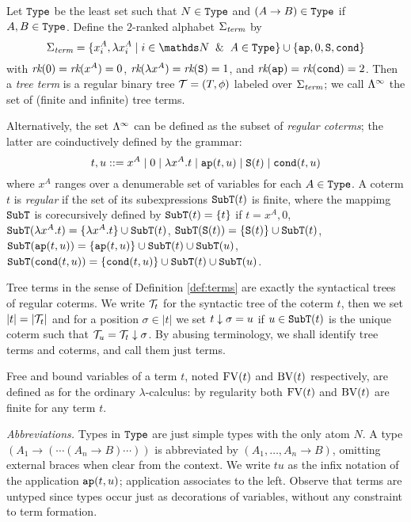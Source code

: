 \begin{definition}\label{def:terms}
Let ${\tt Type}$ be the least
set such that $N \in {\tt Type}$ and $(A \to B) \in {\tt Type}$ if $A,B \in {\tt Type}$.
Define the $2$-ranked alphabet $\Sigma_{\textit{term}}$ by
\[\SigmaTerm = \set{x_i^A, \lambda x_i^A \mid i \in \nat \And A\in \Type} \cup \set{\ap, 0, \Succ, \cond}\]
with $\textit{rk}(0) = \textit{rk}(x^A) = 0$, $\textit{rk}( \lambda x^A) = \textit{rk}({\tt S}) = 1$, and
$\textit{rk}({\tt ap}) = \textit{rk}({\tt cond}) = 2$.
Then a {\em tree term} is a regular binary tree $\BTree = (T, \phi)$ labeled over $\Sigma_{\textit{term}}$; we
call $\Lambda^\infty$ the set of (finite and infinite) tree terms.
\end{definition}

\medskip

Alternatively, the set $\Lambda^\infty$ can be defined as the subset of {\em regular coterms}; the latter are
coinductively defined by the grammar:
\[ t, u ::= x^A \mid 0 \mid \lambda x^A.t \mid {\tt ap}(t,u) \mid {\tt S} (t) \mid {\tt cond}(t, u) \]
where $x^A$ ranges over a denumerable set of variables for each $A \in {\tt Type}$.
A coterm $t$ is {\em regular} if the set of its subexpressions ${\tt SubT}(t)$ is finite,
where the mappimg ${\tt SubT}$ is corecursively defined by ${\tt SubT}(t) = \{ t \}$ if $t = x^A, 0$, 
${\tt SubT}(\lambda x^A.t) = \{ \lambda x^A.t \} \cup {\tt SubT}(t)$, 
${\tt SubT}({\tt S}(t)) = \{ {\tt S}(t) \} \cup {\tt SubT}(t)$,
${\tt SubT}({\tt ap}(t,u)) = \{ {\tt ap}(t,u) \} \cup {\tt SubT}(t) \cup {\tt SubT}(u)$,
${\tt SubT}({\tt cond}(t,u)) = \{ {\tt cond}(t,u) \} \cup {\tt SubT}(t) \cup {\tt SubT}(u)$.

Tree terms in the sense of Definition \ref{def:terms} are exactly the syntactical trees of regular coterms. 
We write $\BTree_t$ for the syntactic tree of the coterm $t$, then we set $|t| = |\BTree_t|$ and for
a position $\sigma \in |t|$ we set $t \downarrow \sigma = u$ if $u \in {\tt SubT}(t)$ is the unique 
coterm such that $\BTree_u = \SubTree{\BTree_t}{\sigma}$. By abusing terminology, we shall 
identify tree terms and coterms, and call them just terms.

Free and bound variables of a term $t$, noted ${{\rm FV}}(t)$ and ${{\rm BV}}(t)$ respectively, are defined as for the ordinary
$\lambda$-calculus: by regularity both 
${{\rm FV}}(t)$ and ${{\rm BV}}(t)$ are finite for any term $t$.

\medskip
{\em Abbreviations.} Types in ${\tt Type}$ are just simple types with the only atom $N$.
A type $(A_1 \to (\cdots (A_n \to B) \cdots))$ is abbreviated by $(A_1, \ldots, A_n \to B)$,
omitting external braces when clear from the context.
We write $tu$ as the infix notation of the application ${\tt ap}(t,u)$; application associates to the left.
Observe that terms are untyped since types occur just as decorations of variables, without any constraint
to term formation.


